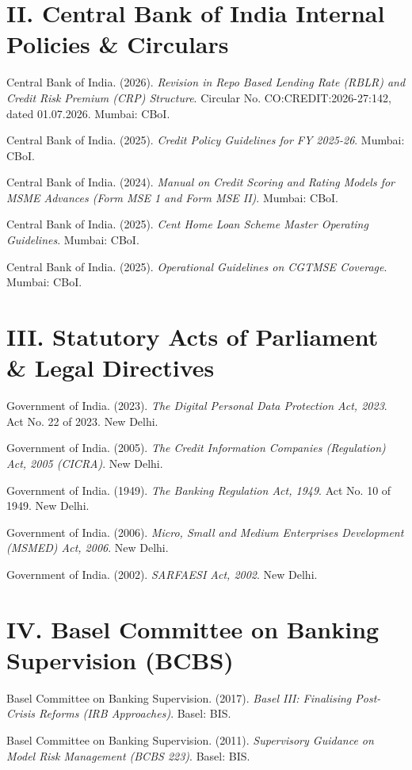 \documentclass[11pt,a4paper,oneside]{report}
\begin{document}
\section*{II. Central Bank of India Internal Policies \& Circulars}
\begin{enumerate}[label={[\arabic*]},resume]
    \item Central Bank of India. (2026). \textit{Revision in Repo Based Lending Rate (RBLR) and Credit Risk Premium (CRP) Structure}. Circular No. CO:CREDIT:2026-27:142, dated 01.07.2026. Mumbai: CBoI.
    \item Central Bank of India. (2025). \textit{Credit Policy Guidelines for FY 2025-26}. Mumbai: CBoI.
    \item Central Bank of India. (2024). \textit{Manual on Credit Scoring and Rating Models for MSME Advances (Form MSE 1 and Form MSE II)}. Mumbai: CBoI.
    \item Central Bank of India. (2025). \textit{Cent Home Loan Scheme Master Operating Guidelines}. Mumbai: CBoI.
    \item Central Bank of India. (2025). \textit{Operational Guidelines on CGTMSE Coverage}. Mumbai: CBoI.
\end{enumerate}

\section*{III. Statutory Acts of Parliament \& Legal Directives}
\begin{enumerate}[label={[\arabic*]},resume]
    \item Government of India. (2023). \textit{The Digital Personal Data Protection Act, 2023}. Act No. 22 of 2023. New Delhi.
    \item Government of India. (2005). \textit{The Credit Information Companies (Regulation) Act, 2005 (CICRA)}. New Delhi.
    \item Government of India. (1949). \textit{The Banking Regulation Act, 1949}. Act No. 10 of 1949. New Delhi.
    \item Government of India. (2006). \textit{Micro, Small and Medium Enterprises Development (MSMED) Act, 2006}. New Delhi.
    \item Government of India. (2002). \textit{SARFAESI Act, 2002}. New Delhi.
\end{enumerate}

\section*{IV. Basel Committee on Banking Supervision (BCBS)}
\begin{enumerate}[label={[\arabic*]},resume]
    \item Basel Committee on Banking Supervision. (2017). \textit{Basel III: Finalising Post-Crisis Reforms (IRB Approaches)}. Basel: BIS.
    \item Basel Committee on Banking Supervision. (2011). \textit{Supervisory Guidance on Model Risk Management (BCBS 223)}. Basel: BIS.
\end{enumerate}
\end{document}
